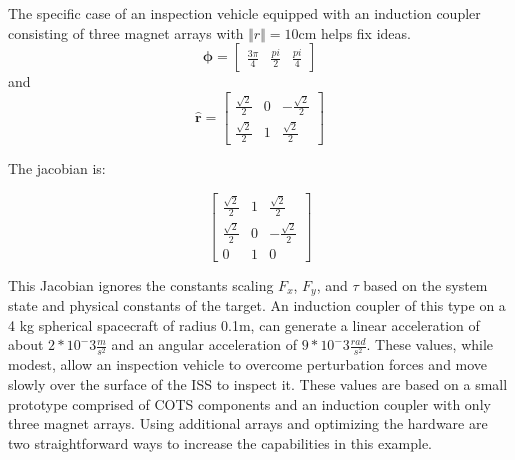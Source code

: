 The specific case of an inspection vehicle equipped with an induction coupler consisting of three magnet arrays with $\Vert r \Vert = 10 \text{cm}$ helps fix ideas.
\begin{equation}\label{eq:specificPhi}
\mathbf{\phi} = \begin{bmatrix} \frac{3\pi}{4}&\frac{pi}{2}&\frac{pi}{4}\end{bmatrix}
\end{equation}
and
\begin{equation}\label{eq:specificR}
\hat{\textbf{r}} = \begin{bmatrix} \frac{\sqrt{2}}{2} & 0 & -\frac{\sqrt{2}}{2} \\
\frac{\sqrt{2}}{2} & 1 & \frac{\sqrt{2}}{2}\end{bmatrix}
\end{equation}

The jacobian is: 

\begin{equation}\label{eq:specificJac}
\begin{bmatrix} \frac{\sqrt{2}}{2} & 1 & \frac{\sqrt{2}}{2} \\
\frac{\sqrt{2}}{2} & 0  & -\frac{\sqrt{2}}{2}
\\0  &  1 & 0 \end{bmatrix}
\end{equation}

This Jacobian ignores the constants scaling $ F_x $, $ F_y $, and‎ $\tau$‎ based on the system state and physical constants of the target.
An induction coupler of this type on a 4 kg spherical spacecraft of radius 0.1m, can generate a linear acceleration of about 
$2*10^-3 \frac{m}{s^2}$ 
and an angular acceleration of 
$9*10^-3 \frac{rad}{s^2}$. 
These values, while modest, allow an inspection vehicle to overcome perturbation forces and move slowly over the surface of the ISS to inspect it. These values are based on a small prototype comprised of COTS components and an induction coupler with only three magnet arrays. Using additional arrays and optimizing the hardware are two straightforward ways to increase the capabilities in this example.

%